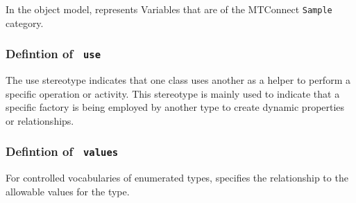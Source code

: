 \FloatBarrier

In the object model, represents Variables that are of the MTConnect \texttt{Sample} category.

\FloatBarrier
\subsubsection{Defintion of \texttt{ use}} \label{type:use}

\FloatBarrier

The use stereotype indicates that one class uses another as a helper to perform 
a specific operation or activity. This stereotype is mainly used to indicate
that a specific factory is being employed by another type to create dynamic
properties or relationships.

\FloatBarrier
\subsubsection{Defintion of \texttt{ values}} \label{type:values}

\FloatBarrier

For controlled vocabularies of enumerated types, specifies the relationship to the allowable 
values for the type.

\FloatBarrier
